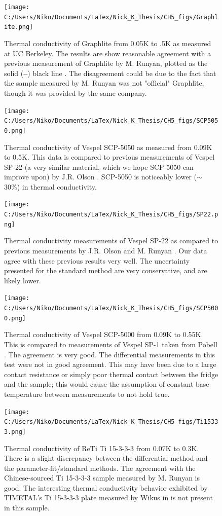\documentclass{report}
\begin{document}
\begin{figure}[h]
\centering
\texttt{[image: C:/Users/Niko/Documents/LaTex/Nick\_K\_Thesis/CH5\_figs/Graphlite.png]}
\caption{Thermal conductivity of Graphlite from 0.05K to .5K as measured at UC Berkeley. The results are show reasonable agreement with a previous measurement of Graphlite by M. Runyan, plotted as the solid (\textbf{--}) black line \cite{run}. The disagreement could be due to the fact that the sample measured by M. Runyan was not "official" Graphlite, though it was provided by the same company.}
\end{figure}

\begin{figure}[h]
\centering
\texttt{[image: C:/Users/Niko/Documents/LaTex/Nick\_K\_Thesis/CH5\_figs/SCP5050.png]}
\caption{Thermal conductivity of Vespel SCP-5050 as measured from 0.09K to 0.5K. This data is compared to previous measurements of Vespel SP-22 (a very similar material, which we hope SCP-5050 can improve upon) by J.R. Olson \cite{ols}. SCP-5050 is noticeably lower ($\sim$ 30\%) in thermal conductivity.}
\end{figure}

\begin{figure}[h]
\centering
\texttt{[image: C:/Users/Niko/Documents/LaTex/Nick\_K\_Thesis/CH5\_figs/SP22.png]}
\caption{Thermal conductivity measurements of Vespel SP-22 as compared to previous measurements by J.R. Olson \cite{ols} and M. Runyan \cite{run}. Our data agree with these previous results very well. The uncertainty presented for the standard method are very conservative, and are likely lower. }
\end{figure}

\begin{figure}[h]
\centering
\texttt{[image: C:/Users/Niko/Documents/LaTex/Nick\_K\_Thesis/CH5\_figs/SCP5000.png]}
\caption{Thermal conductivity of Vespel SCP-5000 from 0.09K to 0.55K. This is compared to measurements of Vespel SP-1 taken from Pobell \cite{pob}. The agreement is very good. The differential measurements in this test were not in good agreement. This may have been due to a large contact resistance or simply poor thermal contact between the fridge and the sample; this would cause the assumption of constant base temperature between measurements to not hold true.}
\end{figure}

\begin{figure}[h]
\centering
\texttt{[image: C:/Users/Niko/Documents/LaTex/Nick\_K\_Thesis/CH5\_figs/Ti15333.png]}
\caption{Thermal conductivity of ReTi Ti 15-3-3-3 from 0.07K to 0.3K. There is a slight discrepancy between the differential method and the parameter-fit/standard methods. The agreement with the Chinese-sourced Ti 15-3-3-3 sample measured by M. Runyan is good. The interesting thermal conductivity behavior exhibited by TIMETAL's Ti 15-3-3-3 plate measured by Wikus in \cite{wik} is not present in this sample.}
\end{figure}
\end{document}
